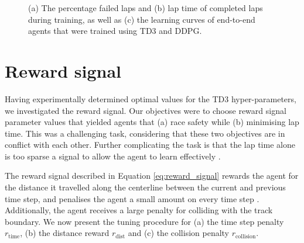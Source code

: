 \begin{figure}[htb!]
    \centering
    
    \caption[Learning curves showing for agents trained using TD3 and DDPG]{(a) The percentage failed laps and (b) lap time of completed laps during training, as well as (c) the learning curves of end-to-end agents that were trained using TD3 and DDPG.}
    \label{fig:learning_method}
\end{figure}








\section{Reward signal}

Having experimentally determined optimal values for the TD3 hyper-parameters, we investigated the reward signal.
Our objectives were to choose reward signal parameter values that yielded agents that (a) race safety while (b) minimising lap time.
This was a challenging task, considering that these two objectives are in conflict with each other.
Further complicating the task is that the lap time alone is too sparse a signal to allow the agent to learn effectively \cite{Perot2017, Jaritz2018}.


The reward signal described in Equation \ref{eq:reward_signal} rewards the agent for the distance it travelled along the centerline between the current and previous time step, and penalises the agent a small amount on every time step \cite{Fuchs2021}. 
Additionally, the agent receives a large penalty for colliding with the track boundary. 
We now present the tuning procedure for (a) the time step penalty $r_{\text{time}}$, (b) the distance reward $r_{\text{dist}}$ and (c) the collision penalty $r_{\text{collision}}$.

